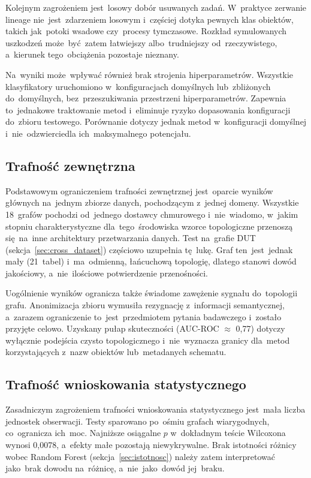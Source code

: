 \documentclass[polish,master,a4paper,oneside]{ppfcmthesis}
\renewcommand{\_}{\origtextunderscore\ifmmode\else\allowbreak\fi}
\begin{document}
Kolejnym zagrożeniem jest~losowy dobór usuwanych zadań. W~praktyce zerwanie
lineage nie~jest~zdarzeniem losowym i~częściej dotyka pewnych klas obiektów,
takich jak~potoki wsadowe czy~procesy tymczasowe. Rozkład symulowanych uszkodzeń
może~być~zatem łatwiejszy albo~trudniejszy od~rzeczywistego, a~kierunek tego~obciążenia
pozostaje nieznany.

Na~wyniki może~wpływać również brak strojenia hiperparametrów. Wszystkie
klasyfikatory uruchomiono w~konfiguracjach domyślnych lub~zbliżonych
do~domyślnych, bez~przeszukiwania przestrzeni hiperparametrów. Zapewnia to~jednakowe
traktowanie metod i~eliminuje ryzyko dopasowania konfiguracji do~zbioru
testowego. Porównanie dotyczy jednak metod w~konfiguracji domyślnej i~nie~odzwierciedla
ich~maksymalnego potencjału.

\subsection{Trafność zewnętrzna}

Podstawowym ograniczeniem trafności zewnętrznej jest~oparcie wyników głównych
na~jednym zbiorze danych, pochodzącym z~jednej domeny. Wszystkie 18~grafów
pochodzi od~jednego dostawcy chmurowego i~nie~wiadomo, w~jakim stopniu
charakterystyczne dla~tego~środowiska wzorce topologiczne przenoszą się~na~inne
architektury przetwarzania danych. Test na~grafie DUT (sekcja~\ref{sec:cross_dataset})
częściowo uzupełnia tę~lukę. Graf ten~jest~jednak mały (21~tabel) i~ma~odmienną,
łańcuchową topologię, dlatego stanowi dowód jakościowy, a~nie~ilościowe
potwierdzenie przenośności.

Uogólnienie wyników ogranicza także świadome zawężenie sygnału do~topologii
grafu. Anonimizacja zbioru wymusiła rezygnację z~informacji semantycznej,
a~zarazem ograniczenie to~jest~przedmiotem pytania badawczego i~zostało
przyjęte celowo. Uzyskany pułap skuteczności (AUC-ROC $\approx$ 0{,}77)
dotyczy wyłącznie podejścia czysto topologicznego i~nie~wyznacza granicy
dla~metod korzystających z~nazw obiektów lub~metadanych schematu.

\subsection{Trafność wnioskowania statystycznego}

Zasadniczym zagrożeniem trafności wnioskowania statystycznego jest~mała liczba
jednostek obserwacji. Testy sparowano po~ośmiu grafach wiarygodnych, co~ogranicza
ich~moc. Najniższe osiągalne $p$ w~dokładnym teście Wilcoxona wynosi 0{,}0078,
a~efekty małe pozostają niewykrywalne. Brak istotności różnicy wobec Random
Forest (sekcja~\ref{sec:istotnosc}) należy zatem interpretować jako~brak dowodu
na~różnicę, a~nie~jako~dowód jej~braku.
\end{document}

